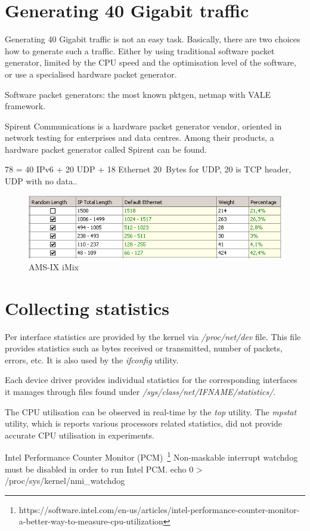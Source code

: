 



\section{Generating 40 Gigabit traffic}
Generating 40 Gigabit traffic is not an easy task.
Basically, there are two choices how to generate such a traffic.
Either by using traditional software packet generator,
limited by the CPU speed and the optimisation level of the software,
or use a specialised hardware packet generator.

Software packet generators:
the most known pktgen,
netmap with VALE framework.

Spirent Communications is a hardware packet generator vendor,
oriented in network testing for enterprises and data centres. %
Among their products, a hardware packet generator called Spirent %
can be found.



78 = 40 IPv6 + 20 UDP + 18 Ethernet
20~Bytes for UDP, 20 is TCP header, UDP with no data..


\begin{figure}
	\centering
	\includegraphics[width=14.5cm,keepaspectratio]{fig/amsix-imix.png}
	\caption{AMS-IX iMix}
	\label{fig:setup-amsix-imix}
\end{figure}


\section{Collecting statistics}
Per interface statistics are provided by the kernel via {\it{/proc/net/dev}} file.
This file provides statistics such as bytes received or transmitted, number of packets, errors, etc.
It is also used by the {\it{ifconfig}} utility.

Each device driver provides individual statistics for the corresponding interfaces it manages through
files found under {\it{/sys/class/net/IFNAME/statistics/}}.

The CPU utilisation can be observed in real-time by the {\it{top}} utility.
The {\it{mpstat}} utility, which is reports various processors related statistics,
did not provide accurate CPU utilisation in experiments.


Intel Performance Counter Monitor (PCM)~\footnote{https://software.intel.com/en-us/articles/intel-performance-counter-monitor-a-better-way-to-measure-cpu-utilization}
Non-maskable interrupt watchdog must be disabled
in order to run Intel PCM.
echo 0 > /proc/sys/kernel/nmi\_watchdog
